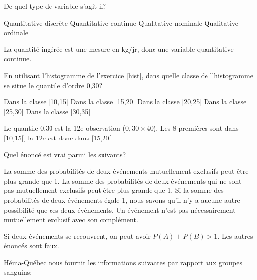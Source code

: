 \begin{questions}
De quel type de variable s'agit-il? 
 

	
\begin{checkboxes}
        \choice Quantitative discrète
        \correctchoice Quantitative continue
        \choice Qualitative nominale
        \choice Qualitative ordinale
	\end{checkboxes}

\begin{solution}
La quantité ingérée est une mesure en kg/jr, donc une variable quantitative continue.
\end{solution}


\question[3] En utilisant l'histogramme de l'exercice \ref{hist}, dans quelle classe de l'histogramme se situe le quantile d'ordre 0,30?

	\begin{checkboxes}
        \choice Dans la classe [10,15[
        \correctchoice Dans la classe [15,20[
        \choice Dans la classe [20,25[
        \choice Dans la classe [25,30[
        \choice Dans la classe [30,35]
	\end{checkboxes}

\begin{solution}
Le quantile 0,30 est la 12e observation ($0,30\times 40$). Les 8 premières sont dans [10,15[, la 12e est donc dans [15,20[.
\end{solution}


\question[3] Quel énoncé est vrai parmi les suivants?

\begin{checkboxes}
    \choice La somme des probabilités de deux événements mutuellement exclusifs peut être plus grande que 1.
    \correctchoice La somme des probabilités de deux événements qui ne sont pas mutuellement exclusifs peut être plus grande que 1.
    \choice Si la somme des probabilités de deux événements égale 1, nous savons qu'il n'y a aucune autre possibilité que ces deux événements.
    \choice Un événement n'est pas nécessairement mutuellement exclusif avec son complément.
\end{checkboxes}

\begin{solution}
Si deux événements se recouvrent, on peut avoir $P(A)+P(B)>1$. Les autres énoncés sont faux.
\end{solution}

\pageblanche
\question\label{sang} Héma-Québec nous fournit les informations suivantes par rapport aux groupes sanguins:




\end{questions}
